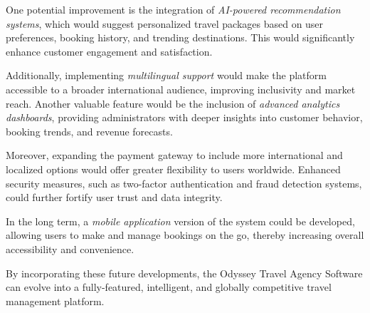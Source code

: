 One potential improvement is the integration of \textit{AI-powered recommendation systems}, which would suggest personalized travel packages based on user preferences, booking history, and trending destinations. This would significantly enhance customer engagement and satisfaction.

Additionally, implementing \textit{multilingual support} would make the platform accessible to a broader international audience, improving inclusivity and market reach. Another valuable feature would be the inclusion of \textit{advanced analytics dashboards}, providing administrators with deeper insights into customer behavior, booking trends, and revenue forecasts.

Moreover, expanding the payment gateway to include more international and localized options would offer greater flexibility to users worldwide. Enhanced security measures, such as two-factor authentication and fraud detection systems, could further fortify user trust and data integrity.

In the long term, a \textit{mobile application} version of the system could be developed, allowing users to make and manage bookings on the go, thereby increasing overall accessibility and convenience.

By incorporating these future developments, the Odyssey Travel Agency Software can evolve into a fully-featured, intelligent, and globally competitive travel management platform.
